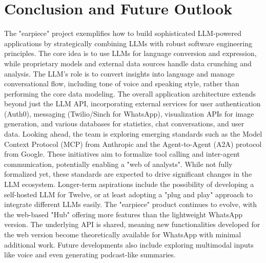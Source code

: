 \documentclass{article}
\begin{document}
\section{Conclusion and Future Outlook}
The "earpiece" project exemplifies how to build sophisticated LLM-powered applications by strategically combining LLMs with robust software engineering principles. The core idea is to use LLMs for language conversion and expression, while proprietary models and external data sources handle data crunching and analysis. The LLM's role is to convert insights into language and manage conversational flow, including tone of voice and speaking style, rather than performing the core data modeling. The overall application architecture extends beyond just the LLM API, incorporating external services for user authentication (Auth0), messaging (Twilio/Sinch for WhatsApp), visualization APIs for image generation, and various databases for statistics, chat conversations, and user data. Looking ahead, the team is exploring emerging standards such as the Model Context Protocol (MCP) from Anthropic and the Agent-to-Agent (A2A) protocol from Google. These initiatives aim to formalize tool calling and inter-agent communication, potentially enabling a "web of analysts". While not fully formalized yet, these standards are expected to drive significant changes in the LLM ecosystem. Longer-term aspirations include the possibility of developing a self-hosted LLM for Twelve, or at least adopting a "plug and play" approach to integrate different LLMs easily. The "earpiece" product continues to evolve, with the web-based "Hub" offering more features than the lightweight WhatsApp version. The underlying API is shared, meaning new functionalities developed for the web version become theoretically available for WhatsApp with minimal additional work. Future developments also include exploring multimodal inputs like voice and even generating podcast-like summaries.
\end{document}
